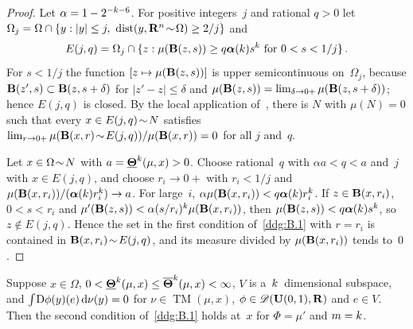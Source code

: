 \documentclass[a4paper,twoside,leqno]{article}
\DeclareMathOperator{\TM}{TM}                   %
\begin{document}
\begin{proof}
    Let $\alpha = 1 - 2^{-k-6}$. For positive integers~$j$ and rational $q > 0$ let $\Omega_j =
    \Omega \cap \{ y : |y| \le j,\ \operatorname{dist}(y, \mathbf{R}^{n} \!\sim\! \Omega) \ge 2/j \}$ and
    \begin{displaymath}
        E(j,q) = \Omega_j \cap \{ z : \mu(\mathbf{B}(z,s)) \ge q \boldsymbol{\alpha}(k) s^{k} \text{
        for $0 < s < 1/j$} \} \,.
    \end{displaymath}
    For $s < 1/j$ the function $[ z \mapsto \mu(\mathbf{B}(z,s)) ]$ is upper semicontinuous on~$\Omega_j$,
    because $\mathbf{B}(z',s) \subset \mathbf{B}(z,s + \delta)$ for $|z' - z| \le \delta$ and
    $\mu(\mathbf{B}(z,s)) = \lim_{\delta \to 0+} \mu(\mathbf{B}(z,s + \delta))$; hence $E(j,q)$ is
    closed. By the local application of~\cite[2.8.18, 2.9.11]{Federer1969}, there is $N$ with
    $\mu(N) = 0$ such that every $x \in E(j,q) \!\sim\! N$ satisfies $\lim_{r \to 0+}
    \mu(\mathbf{B}(x,r) \!\sim\! E(j,q)) / \mu(\mathbf{B}(x,r)) = 0$ for all $j$ and~$q$.

    Let $x \in \Omega \!\sim\! N$ with $a = \boldsymbol{\underline{\Theta}}^{k}(\mu,x) > 0$. Choose rational~$q$
    with $\alpha a < q < a$ and~$j$ with $x \in E(j,q)$, and choose $r_i \to 0+$ with $r_i < 1/j$
    and $\mu(\mathbf{B}(x,r_i)) / (\boldsymbol{\alpha}(k) r_i^{k}) \to a$. For large~$i$, $\alpha
    \mu(\mathbf{B}(x,r_i)) < q \boldsymbol{\alpha}(k) r_i^{k}$. If $z \in \mathbf{B}(x,r_i)$, $0 < s <
    r_i$ and $\mu'(\mathbf{B}(z,s)) < \alpha (s/r_i)^{k} \mu(\mathbf{B}(x,r_i))$, then
    $\mu(\mathbf{B}(z,s)) < q \boldsymbol{\alpha}(k) s^{k}$, so $z \notin E(j,q)$. Hence the set in the
    first condition of~\ref{ddg:B.1} with $r = r_i$ is contained in $\mathbf{B}(x,r_i) \!\sim\!
    E(j,q)$, and its measure divided by $\mu(\mathbf{B}(x,r_i))$ tends to~$0$.
\end{proof}

\begin{lemma}[new]
    \label{new:preissB}
    Suppose $x \in \Omega$, $0 < \boldsymbol{\underline{\Theta}}^{k}(\mu,x) \le \boldsymbol{\overline{\Theta}}^{k}(\mu,x) < \infty$,
    $V$ is a~$k$~dimensional subspace, and ${\textstyle\int_{}^{}} \mathrm{D} \phi(y)(e) \,\mathrm{d} \nu(y) = 0$ for $\nu
    \in \TM(\mu,x)$, $\phi \in \mathscr{D}(\mathbf{U}(0,1),\mathbf{R})$ and $e \in V$. Then the second condition
    of~\ref{ddg:B.1} holds at~$x$ for $\Phi = \mu'$ and $m = k$.
\end{lemma}
\end{document}
